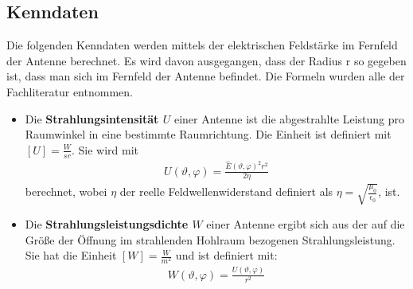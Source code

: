 \subsection{Kenndaten}
Die folgenden Kenndaten werden mittels der elektrischen Feldstärke im Fernfeld der Antenne berechnet. Es wird davon ausgegangen, dass der Radius r so gegeben ist, dass man sich im Fernfeld der Antenne befindet. Die Formeln wurden alle der Fachliteratur entnommen. \citep[vgl.][]{balanis} \citep[vgl.][]{orfanidi} \citep[vgl.][]{kark}
\begin{itemize}


\item Die \textbf{Strahlungsintensität $U$} einer Antenne ist die abgestrahlte Leistung pro Raumwinkel in eine bestimmte  Raumrichtung. Die Einheit ist definiert mit $\left[ U \right]=\frac{W}{sr}$. Sie wird mit
\begin{align*}
U\left(\vartheta,\varphi \right) = \frac{\hat{E}\left(\vartheta,\varphi \right)^2r^2 }{2\eta}
\end{align*} 
berechnet, wobei $\eta$ der reelle Feldwellenwiderstand definiert als $\eta=\sqrt{\frac{\mu_0}{\epsilon_0}}$, ist.

\item Die \textbf{Strahlungsleistungsdichte $W$} einer Antenne ergibt sich aus der auf die Größe der Öffnung im strahlenden Hohlraum bezogenen Strahlungsleistung. Sie hat die Einheit $\left[W \right]=\frac{W}{m^2}$ und ist definiert mit:
\begin{align*}
W\left(\vartheta,\varphi \right) = \frac{U\left(\vartheta,\varphi \right) }{r^2}
\end{align*} 


\end{itemize}
